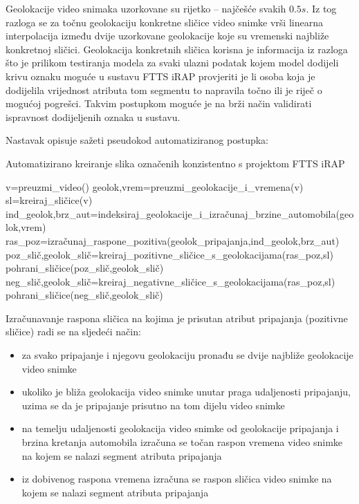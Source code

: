 \documentclass[times, utf8, diplomski, numeric]{fer}
\begin{document}
Geolokacije video snimaka uzorkovane su rijetko -- najčešće svakih $0.5s$. 
Iz tog razloga se za točnu geolokaciju konkretne sličice video snimke vrši linearna interpolacija između dvije uzorkovane geolokacije koje su vremenski najbliže konkretnoj sličici.
Geolokacija konkretnih sličica korisna je informacija iz razloga što je prilikom testiranja modela za svaki ulazni podatak kojem model dodijeli krivu oznaku moguće u sustavu FTTS iRAP provjeriti je li osoba koja je dodijelila vrijednost atributa tom segmentu to napravila točno ili je riječ o mogućoj pogrešci. 
Takvim postupkom moguće je na brži način validirati ispravnost dodijeljenih oznaka u sustavu.

Nastavak opisuje sažeti pseudokod automatiziranog postupka:
\begin{algorithm}[H]
\caption{Automatizirano kreiranje slika označenih konzistentno s projektom FTTS iRAP}
\label{alg:dataset_creator}
\begin{algorithmic}
\STATE v=preuzmi\_video()
\STATE geolok,vrem=preuzmi\_geolokacije\_i\_vremena(v)
\STATE sl=kreiraj\_sličice(v)
\STATE ind\_geolok,brz\_aut=indeksiraj\_geolokacije\_i\_izračunaj\_brzine\_automobila(geolok,vrem)
\STATE ras\_poz=izračunaj\_raspone\_pozitiva(geolok\_pripajanja,ind\_geolok,brz\_aut)
\STATE poz\_slič,geolok\_slič=kreiraj\_pozitivne\_sličice\_s\_geolokacijama(ras\_poz,sl)
\STATE pohrani\_sličice(poz\_slič,geolok\_slič)
\STATE neg\_slič,geolok\_slič=kreiraj\_negativne\_sličice\_s\_geolokacijama(ras\_poz,sl)
\STATE pohrani\_sličice(neg\_slič,geolok\_slič)
\ENDWHILE
\end{algorithmic}
\end{algorithm}

\noindent Izračunavanje raspona sličica na kojima je prisutan atribut pripajanja (pozitivne sličice) radi se na sljedeći način:
\begin{itemize}
 \item za svako pripajanje i njegovu geolokaciju pronađu se dvije najbliže geolokacije video snimke
 \item ukoliko je bliža geolokacija video snimke unutar praga udaljenosti pripajanju, uzima se da je pripajanje prisutno na tom dijelu video snimke
 \item na temelju udaljenosti geolokacija video snimke od geolokacije pripajanja i brzina kretanja automobila izračuna se točan raspon vremena video snimke na kojem se nalazi segment atributa pripajanja
 \item iz dobivenog raspona vremena izračuna se raspon sličica video snimke na kojem se nalazi segment atributa pripajanja
\end{itemize}
\end{document}
